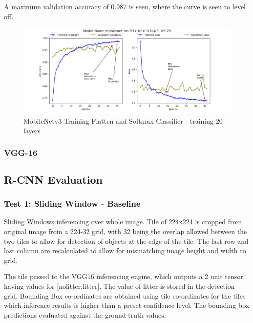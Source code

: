 \documentclass{article}
\begin{document}
\begin{enumerate}
A maximum validation accuracy of 0.987 is seen, where the curve is seen to level off. 

\begin{figure}[H]
\centering
\label{fig:mob3-3}
\includegraphics[scale=0.6]{images/mob3-3.png}
\caption{MobileNetv3 Training Flatten and Softmax Classifier - training 20 layers}
\end{figure}


\end{enumerate}


\subsubsection{VGG-16}

\subsection{R-CNN Evaluation}

\subsubsection{Test 1: Sliding Window - Baseline}

Sliding Windows inferencing over whole image. Tile of 224x224 is cropped from original image from a 224-32 grid, with 32 being the overlap allowed between the two tiles to allow for detection of objects at the edge of the tile. The last row and last column are recalculated to allow for mismatching image height and width to grid. \newline

The tile passed to the VGG16 inferencing engine, which outputs a 2 unit tensor having values for [nolitter,litter]. The value of litter is stored in the detection grid. Bounding Box co-ordinates are obtained using tile co-ordinates for the tiles which inference results is higher than a preset confidence level. The bounding box predictions evaluated against the ground-truth values.\newline
\end{document}
